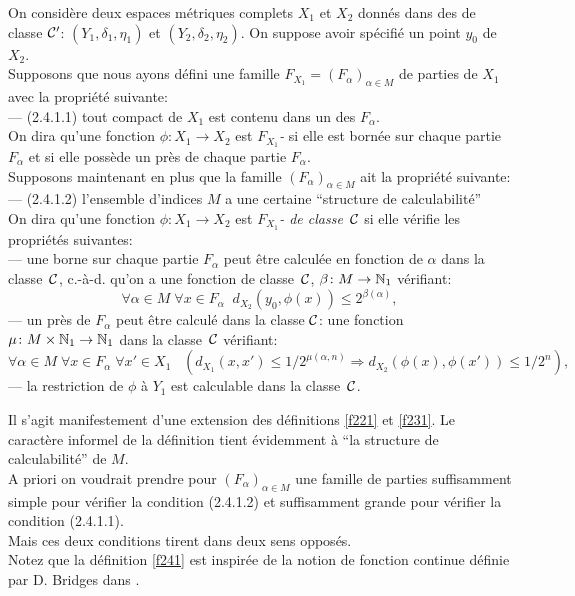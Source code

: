 \begin{fdefinition} \label{f241}
On considère deux espaces métriques complets  $X_1$  et  $X_2$  donnés 
dans  des \rps  de classe  ${{\cal C}}'$:   $(Y_1,\delta_1,\eta_1)$  et  
$(Y_2,\delta_2,\eta_2).$  On suppose avoir spécifié un point  $y_0$ de 
$X_2$.\\ 
Supposons que nous ayons défini une famille  $F_{X_1} = (F_{\alpha})_{\alpha \in M}$  de parties de  $X_1$  avec la propriété suivante:\\
--- (2.4.1.1)   tout compact de  $X_1$  est contenu dans un des  $F_{\alpha}$. 
\\
On dira qu'une fonction  $\phi\colon  X_1 \rightarrow X_2$  est   {\em $F_{X_1}$-
\unicoz}   si elle est bornée sur chaque partie  $F_{\alpha}$  et si elle 
possède un \mcu près de chaque partie $F_{\alpha}$.\\  
Supposons maintenant en plus que la famille $(F_{\alpha})_{\alpha \in M}$  ait 
la propriété suivante:\\
--- (2.4.1.2)   l'ensemble d'indices  $M$  a une certaine ``structure de 
calculabilité''\\
On dira qu'une fonction  $\phi\colon  X_1 \rightarrow X_2$  est  {\em $F_{X_1}$-\unico 
de classe~${{\cal C}}$  }  si elle vérifie les propriétés suivantes:\\
--- une borne sur chaque partie  $F_{\alpha}$  peut être calculée en 
fonction de $\alpha$   dans la classe~${{\cal C}}$, c.-à-d. qu'on a une fonction de 
classe~${{\cal C}}$,     $ \beta \colon  M \rightarrow \mathbb {N}_1$   vérifiant:  
\[
\forall \alpha \in M \; \forall x \in F_{\alpha} \; \;
 d_{X_2}(y_0, \phi (x)) \leq 2^{\beta(\alpha)},
\] 
--- un \mcu près de  $F_{\alpha}$  peut être calculé dans la classe  
${{\cal C}}$:  une fonction   $\mu \colon  M \times \mathbb {N}_1 \rightarrow \mathbb {N}_1$   dans la 
classe~${{\cal C}}$   vérifiant:
\[
\forall \alpha \in M \; \forall x \in F_{\alpha} \; \forall x' \in X_1\; \; \; \left(d_{X_1}(x,x') 
\leq 1/2^{\mu(\alpha,n)} \Rightarrow d_{X_2}(\phi(x),\phi(x'))
 \leq 1/2^n \right),
\]
--- la restriction de  $\phi$  à  $Y_1$ est calculable dans la classe~${{\cal C}}$.
\end{fdefinition}
Il s'agit manifestement d'une extension des définitions \ref{f221} et \ref{f231}.
Le caractère informel de la définition tient évidemment à ``la 
structure de calculabilité'' de  $M$.\\
A priori on voudrait prendre pour  $(F_{\alpha})_{\alpha \in M}$ une famille de 
parties suffisamment simple pour vérifier la condition (2.4.1.2) et 
suffisamment grande pour vérifier la condition (2.4.1.1).\\
Mais ces deux conditions tirent dans deux sens opposés.\\ 
Notez que la définition \ref{f241} est inspirée de la notion de fonction 
continue définie par D. Bridges dans \cite[Constructive functional analysis]{fBr}.

